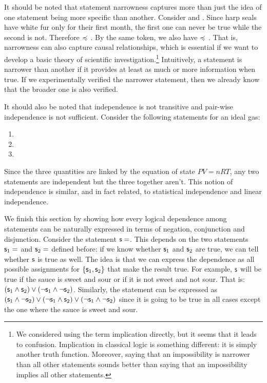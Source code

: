 \documentclass[11pt,letterpaper,fleqn]{memoir} %
\begin{document}
It should be noted that statement narrowness captures more than just the idea of one statement being more specific than another. Consider  and . Since harp seals have white fur only for their first month, the first one can never be true while the second is not. Therefore  $\preccurlyeq$ . By the same token, we also have  $\preccurlyeq$ . That is, narrowness can also capture causal relationships, which is essential if we want to develop a basic theory of scientific investigation.\footnote{We considered using the term implication directly, but it seems that it leads to confusion. Implication in classical logic is something different: it is simply another truth function. Moreover, saying that an impossibility is narrower than all other statements sounds better than saying that an impossibility implies all other statements.} Intuitively, a statement is narrower than another if it provides at least as much or more information when true. If we experimentally verified the narrower statement, then we already know that the broader one is also verified.

It should also be noted that independence is not transitive and pair-wise independence is not sufficient. Consider the following statements for an ideal gas:
\begin{enumerate}
	\item {}
	\item {}
	\item {}
\end{enumerate}
Since the three quantities are linked by the equation of state $PV=nRT$, any two statements are independent but the three together aren't. This notion of independence is similar, and in fact related, to statistical independence and linear independence.

We finish this section by showing how every logical dependence among statements can be naturally expressed in terms of negation, conjunction and disjunction. Consider the statement $\mathsf{s}=$. This depends on the two statements $\mathsf{s}_1=$ and $\mathsf{s}_2=$ defined before: if we know whether $\mathsf{s}_1$ and $\mathsf{s}_2$ are true, we can tell whether $\mathsf{s}$ is true as well. The idea is that we can express the dependence as all possible assignments for $\{\mathsf{s}_1, \mathsf{s}_2 \}$ that make the result true. For example, $\mathsf{s}$ will be true if the sauce is sweet and sour or if it is not sweet and not sour. That is: $(\mathsf{s}_1 \wedge \mathsf{s}_2) \vee (\neg \mathsf{s}_1 \wedge \neg \mathsf{s}_2)$. Similarly, the statement  can be expressed as $(\mathsf{s}_1 \wedge \neg \mathsf{s}_2) \vee (\neg \mathsf{s}_1 \wedge \mathsf{s}_2) \vee (\neg \mathsf{s}_1 \wedge \neg \mathsf{s}_2)$ since it is going to be true in all cases except the one where the sauce is sweet and sour.
\end{document}

